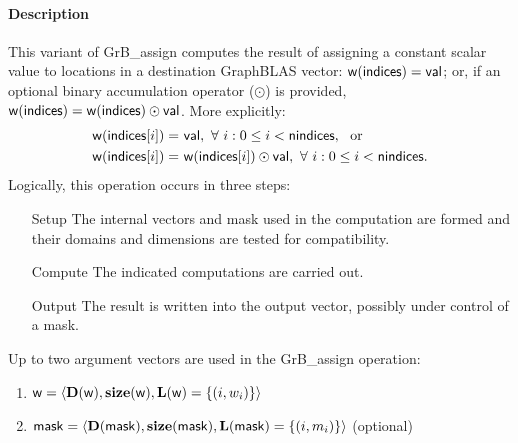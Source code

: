 \paragraph{Description}

This variant of {\sf GrB\_assign} computes the result of assigning a constant
scalar value to locations in a destination GraphBLAS vector: 
${\sf w}({\sf indices}) = {\sf val}$; or, if an optional binary accumulation 
operator ($\odot$) is provided, 
${\sf w}({\sf indices}) = {\sf w}({\sf indices}) \odot {\sf val}$.  
More explicitly:
\[
\begin{aligned}
	{\sf w}({\sf indices}[i]) = &\ {\sf val}, \ 
    \forall \  i : 0 \leq i < {\sf nindices}, \mbox{~~or~~} \\
    {\sf w}({\sf indices}[i]) = &\ {\sf w}({\sf indices}[i]) \odot {\sf val}, \ 
    \forall \  i : 0 \leq i < {\sf nindices}.
\end{aligned}
\]  
Logically, this operation occurs in three steps:
\begin{enumerate}[leftmargin=0.75in]
\item[Setup] The internal vectors and mask used in the computation are formed 
and their domains and dimensions are tested for compatibility.
\item[Compute] The indicated computations are carried out.
\item[Output] The result is written into the output vector, possibly under 
control of a mask.
\end{enumerate}

Up to two argument vectors are used in the {\sf GrB\_assign} operation:
\begin{enumerate}
	\item ${\sf w} = \langle \bold{D}({\sf w}),\bold{size}({\sf w}),
    \bold{L}({\sf w}) = \{(i,w_i) \} \rangle$
    
	\item ${\sf mask} = \langle \bold{D}({\sf mask}),\bold{size}({\sf mask}),
    \bold{L}({\sf mask}) = \{(i,m_i) \} \rangle$ (optional)
\end{enumerate}

